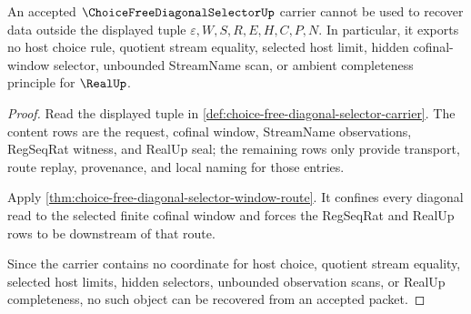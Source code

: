 \begin{theorem}
\label{thm:choice-free-diagonal-selector-nonescape}
An accepted $\ChoiceFreeDiagonalSelectorUp$ carrier cannot be used to recover data outside the displayed tuple $\varepsilon,W,S,R,E,H,C,P,N$. In particular, it exports no host choice rule, quotient stream equality, selected host limit, hidden cofinal-window selector, unbounded StreamName scan, or ambient completeness principle for $\RealUp$.
\end{theorem}
\begin{proof}
Read the displayed tuple in \autoref{def:choice-free-diagonal-selector-carrier}. The content rows are the request, cofinal window, StreamName observations, RegSeqRat witness, and RealUp seal; the remaining rows only provide transport, route replay, provenance, and local naming for those entries.

Apply \autoref{thm:choice-free-diagonal-selector-window-route}. It confines every diagonal read to the selected finite cofinal window and forces the RegSeqRat and RealUp rows to be downstream of that route.

Since the carrier contains no coordinate for host choice, quotient stream equality, selected host limits, hidden selectors, unbounded observation scans, or RealUp completeness, no such object can be recovered from an accepted packet.
\end{proof}

